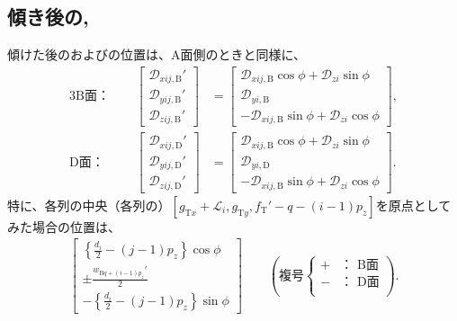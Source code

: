 \subsection{傾き後の\BfaceDimple, \DfaceDimple}
傾けた後の\BFaceDimpleIRowJ および\DFaceDimpleIRowJ の位置は、A面側のときと同様に、
\begin{alignat*}{3}
  \text{B面：}&~~&
  \left[
    \begin{array}{c}
      \mathcal D_{xij,\mathrm B}'\\
      \mathcal D_{yij,\mathrm B}'\\
      \mathcal D_{zij,\mathrm B}'
    \end{array}
  \right]
 &= \left[
    \begin{array}{c}
      \mathcal D_{xij,\mathrm B}\cos\phi+\mathcal D_{zi}\sin\phi\\
      \mathcal D_{yi,\mathrm B}\\
      -\mathcal D_{xij,\mathrm B}\sin\phi+\mathcal D_{zi}\cos\phi
    \end{array}
    \right],\\[2pt]
  \text{D面：}&~~&
  \left[
    \begin{array}{c}
      \mathcal D_{xij,\mathrm D}'\\
      \mathcal D_{yij,\mathrm D}'\\
      \mathcal D_{zij,\mathrm D}'
    \end{array}
  \right]
 &= \left[
    \begin{array}{c}
      \mathcal D_{xij,\mathrm B}\cos\phi+\mathcal D_{zi}\sin\phi\\
      \mathcal D_{yi,\mathrm D}\\
      -\mathcal D_{xij,\mathrm B}\sin\phi+\mathcal D_{zi}\cos\phi
    \end{array}
    \right].
\end{alignat*}
特に、各列の中央（各列の\CurvatureCenter）$[g_{\mathrm Tx}+\mathcal L_i, g_{\mathrm Ty}, f_\mathrm T'-q-(i-1)p_z]$を原点としてみた場合の位置は、
\begin{align*}
  \left[
  \begin{array}{c}
    \displaystyle \left\{\frac{d_i}2-(j-1)p_z\right\}\cos\phi\\
    \displaystyle \pm\frac{w_{\mathrm Bq+(i-1)p_z}'}2\\
    \displaystyle -\left\{\frac{d_i}2-(j-1)p_z\right\}\sin\phi
  \end{array}
  \right]\qquad
  \left(
  \text{複号}
  \left\{
  \begin{array}{rl}
    \!+\!\!\!\!& \text{： B面}\\
    \!-\!\!\!\!& \text{： D面}\\
  \end{array}
  \right.
  \right).
\end{align*}

